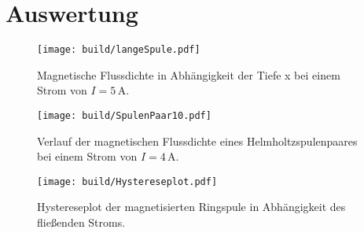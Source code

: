 \section{Auswertung}
\label{sec:Auswertung}


\begin{figure}[H]
    \centering
    \texttt{[image: build/langeSpule.pdf]}
    \caption{Magnetische Flussdichte in Abhängigkeit der Tiefe x bei einem Strom von $I= 5 \, \unit{\ampere}$.}
    \label{fig:Hystereseschema}
  \end{figure}


  \begin{figure}[H]
    \centering
    \texttt{[image: build/SpulenPaar10.pdf]}
    \caption{Verlauf der magnetischen Flussdichte eines Helmholtzspulenpaares bei einem Strom von $I= 4 \, \unit{\ampere}$.}
    \label{fig:Hystereseschema}
  \end{figure}


\begin{figure}[H]
    \centering
    \texttt{[image: build/Hystereseplot.pdf]}
    \caption{Hystereseplot der magnetisierten Ringspule in Abhängigkeit des fließenden Stroms.}
    \label{fig:Hystereseschema}
  \end{figure}
